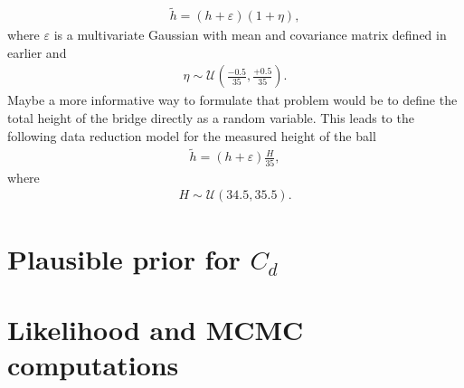 \documentclass{article}
\begin{document}
\begin{enumerate}
\begin{align*}
 \tilde{h} = \left( h + \varepsilon \right) (1 + \eta),
\end{align*}
where $\varepsilon$ is a multivariate Gaussian with mean and covariance matrix defined in earlier and 
\begin{align*}
 \eta \sim \mathcal{U}\left( \frac{-0.5}{35}, \frac{+0.5}{35} \right) .
\end{align*}
Maybe a more informative way to formulate that problem would be to define the total height of the bridge directly as a random variable. This leads to the following data reduction model for the measured height of the ball
\begin{align*}
 \tilde{h} = ( h  + \varepsilon ) \frac{H}{35},
\end{align*}
where
\begin{align*}
 H \sim \mathcal{U} \left( 34.5, 35.5 \right).
\end{align*}
\end{enumerate}

\section{Plausible prior for $C_d$}

\section{Likelihood and MCMC computations}
\end{document}
